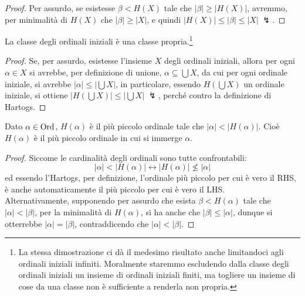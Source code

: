 \begin{proof}
	Per assurdo, se esistesse $\beta < H(X)$ tale che $|\beta| \geq |H(X)|$, avremmo, per minimalit\`a di $H(X)$ che $|\beta| \geq |X|$, e quindi
	$|H(X)| \leq |\beta| \leq |X| \; \lightning$.
\end{proof}

\begin{corollary}
	La classe degli ordinali iniziali \`e una classe propria.\footnote{La stessa dimostrazione ci d\`a il medesimo risultato anche limitandoci agli ordinali iniziali infiniti. Moralmente staremmo 
	escludendo dalla classe degli ordinali iniziali un insieme di ordinali iniziali finiti, ma togliere un insieme di cose da una classe non \`e sufficiente a renderla non propria.}
\end{corollary}

\begin{proof}
	Se, per assurdo, esistesse l'insieme $X$ degli ordinali iniziali, allora per ogni $\alpha \in X$ si avrebbe, per definizione di unione, $\alpha \subseteq \bigcup X$,
	da cui per ogni ordinale iniziale, si avrebbe $|\alpha| \leq \left\lvert  \bigcup X\right\rvert$, in particolare, essendo $H\left(\bigcup X\right)$ un ordinale iniziale, si ottiene $\left\lvert H\left(\bigcup X\right)\right\rvert \leq \left\lvert  \bigcup X\right\rvert \; \lightning$, perch\'e
	contro la definizione di Hartogs.
\end{proof}

\begin{remark}
	Dato $\alpha \in \operatorname{Ord}$, $H(\alpha)$ \`e il pi\`u piccolo ordinale tale che $|\alpha| < |H(\alpha)|$.
	Cio\`e $H(\alpha)$ \`e il pi\`u piccolo ordinale in cui si immerge $\alpha$.
\end{remark}

\begin{proof}
	Siccome le cardinalit\`a degli ordinali sono tutte confrontabili:
	\[ |\alpha| < |H(\alpha)| \leftrightarrow |H(\alpha)| \not\leq |\alpha|
		\]
	ed essendo l'Hartogs, per definizione, l'ordinale pi\`u piccolo per cui \`e vero il RHS, \`e anche automaticamente il pi\`u piccolo per cui \`e vero il LHS.\\
	Alternativamente, supponendo per assurdo che esista $\beta < H(\alpha)$ tale che $|\alpha| < |\beta|$, per la minimalit\`a di $H(\alpha)$, si ha anche che $|\beta| \leq |\alpha|$,
	dunque si otterrebbe $|\alpha| = |\beta|$, contraddicendo che $|\alpha| < |\beta|$.
\end{proof}

